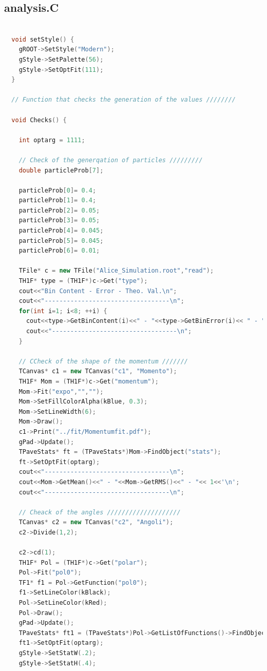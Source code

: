 \documentclass[a4paper, 11pt]{article}
\begin{document}
      \subsection{analysis.C}
        \begin{lstlisting}[language=c++, style=code]

  void setStyle() {
    gROOT->SetStyle("Modern");
    gStyle->SetPalette(56);
    gStyle->SetOptFit(111);
  }

  // Function that checks the generation of the values ////////

  void Checks() {

    int optarg = 1111;

    // Check of the generqation of particles /////////
    double particleProb[7];

    particleProb[0]= 0.4;
    particleProb[1]= 0.4;
    particleProb[2]= 0.05;
    particleProb[3]= 0.05;
    particleProb[4]= 0.045;
    particleProb[5]= 0.045;
    particleProb[6]= 0.01;

    TFile* c = new TFile("Alice_Simulation.root","read");
    TH1F* type = (TH1F*)c->Get("type");
    cout<<"Bin Content - Error - Theo. Val.\n";
    cout<<"----------------------------------\n";
    for(int i=1; i<8; ++i) {
      cout<<type->GetBinContent(i)<<" - "<<type->GetBinError(i)<< " - "<< particleProb[i-1]*1E7<< '\n';
      cout<<"----------------------------------\n";
    }

    // CCheck of the shape of the momentum ///////
    TCanvas* c1 = new TCanvas("c1", "Momento");
    TH1F* Mom = (TH1F*)c->Get("momentum");
    Mom->Fit("expo","","");
    Mom->SetFillColorAlpha(kBlue, 0.3);
    Mom->SetLineWidth(6);
    Mom->Draw();
    c1->Print("../fit/Momentumfit.pdf");
    gPad->Update();
    TPaveStats* ft = (TPaveStats*)Mom->FindObject("stats");
    ft->SetOptFit(optarg);
    cout<<"----------------------------------\n";
    cout<<Mom->GetMean()<<" - "<<Mom->GetRMS()<<" - "<< 1<<'\n';
    cout<<"----------------------------------\n";

    // Cheack of the angles ////////////////////
    TCanvas* c2 = new TCanvas("c2", "Angoli");
    c2->Divide(1,2);

    c2->cd(1);
    TH1F* Pol = (TH1F*)c->Get("polar");
    Pol->Fit("pol0");
    TF1* f1 = Pol->GetFunction("pol0");
    f1->SetLineColor(kBlack);
    Pol->SetLineColor(kRed);
    Pol->Draw();
    gPad->Update();
    TPaveStats* ft1 = (TPaveStats*)Pol->GetListOfFunctions()->FindObject("stats");
    ft1->SetOptFit(optarg);
    gStyle->SetStatW(.2);
    gStyle->SetStatH(.4);


\end{lstlisting}
\end{document}
